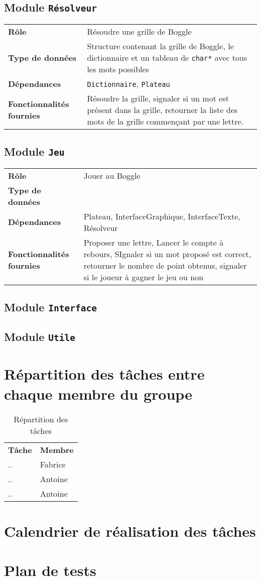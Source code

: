 \documentclass[12pt,a4paper,openany]{article}
\begin{document}
		\subsection{Module \texttt{Résolveur}}
		\begin{tabular}{p{5cm} p{12cm}}
			\textbf{Rôle} & Résoudre une grille de Boggle\\
			\textbf{Type de données} & Structure contenant la grille de Boggle, le dictionnaire et un tableau de \texttt{char*} avec tous les mots possibles\\
			\textbf{Dépendances} & \texttt{Dictionnaire}, \texttt{Plateau}\\
			\textbf{Fonctionnalités fournies} & Résoudre la grille, signaler si un mot est présent dans la grille, retourner la liste des mots de la grille
			commençant par une lettre. 
		\end{tabular}
		\subsection{Module \texttt{Jeu}}
		\begin{tabular}{p{5cm} p{12cm}}
			\textbf{Rôle} & Jouer au Boggle \\ 
			\textbf{Type de données} & \\ 
			\textbf{Dépendances} & Plateau, InterfaceGraphique, InterfaceTexte, Résolveur\\
			\textbf{Fonctionnalités fournies} & Proposer une lettre, Lancer le compte à rebours, SIgnaler si un mot proposé est correct, retourner le nombre de
			point obtenus, signaler si le joueur à gagner le jeu ou non
		\end{tabular}
		\subsection{Module \texttt{Interface}}
		\subsection{Module \texttt{Utile}}
	\section{Répartition des tâches entre chaque membre du groupe}
		\begin{table}[H]
			\centering
		\begin{tabular}{m{12cm} m{5cm}}
			\rowcolor{gris}\textbf{Tâche} & \textbf{Membre}\\
			..& Fabrice \\
			..& Antoine\\
			..& Antoine\\
		\end{tabular}
		\caption{Répartition des tâches}
	\end{table}
	\section{Calendrier de réalisation des tâches}
	\section{Plan de tests}
	
	
\end{document}
